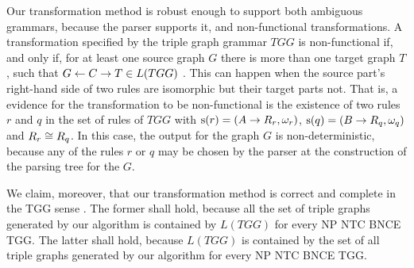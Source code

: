 Our transformation method is robust enough to support both ambiguous grammars, because the parser supports it, and non-functional transformations. A transformation specified by the triple graph grammar $TGG$ is non-functional if, and only if, for at least one source graph $G$ there is more than one target graph $T$, such that $G \overset{}{\leftarrow} C \overset{}{\rightarrow} T \in L(TGG)$ \cite{Hermann2010}. This can happen when the source part's right-hand side of two rules are isomorphic but their target parts not. That is, a evidence for the transformation to be non-functional is the existence of two rules $r$ and $q$ in the set of rules of $TGG$ with $\operatorname{s}(r) = (A \to R_r,\omega_r)$, $\operatorname{s}(q) = (B \to R_q,\omega_q)$ and $R_r \cong R_q$. In this case, the output for the graph $G$ is non-deterministic, because any of the rules $r$ or $q$ may be chosen by the parser at the construction of the parsing tree for the $G$.

We claim, moreover, that our transformation method is correct and complete in the TGG sense \cite{Hermann2013}. The former shall hold, because all the set of triple graphs generated by our algorithm is contained by $L(TGG)$ for every NP NTC BNCE TGG. The latter shall hold, because $L(TGG)$ is contained by the set of all triple graphs generated by our algorithm for every NP NTC BNCE TGG.
